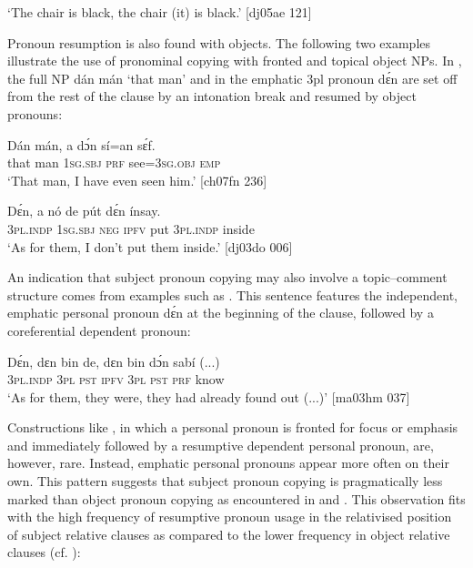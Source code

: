 \glt ‘The chair is black, the chair (it) is black.’ [dj05ae 121]
\z

Pronoun resumption is also found with objects{\fff}. The following two examples illustrate the use of pronominal copying with fronted and topical object NPs. In , the full NP dán mán ‘that man’ and in  the emphatic 3pl pronoun dɛ́n are set off from the rest of the clause by an intonation break and resumed by object pronouns: 


\ea%
    \label{ex:key:516}
    \gll Dán    mán,  a    dɔ́n  sí=an    sɛ́f.\\
that    man    \textsc{1sg.sbj}  \textsc{prf}  see=\textsc{3sg.obj}  \textsc{emp}\\

\glt ‘That man, I have even seen him.’ [ch07fn 236]
\z


\ea%
    \label{ex:key:517}
    \gll Dɛ́n,    a    nó  de  pút  dɛ́n    ínsay.\\
\textsc{3pl.indp}  \textsc{1sg.sbj}  \textsc{neg}  \textsc{ipfv}  put  \textsc{3pl.indp}  inside\\

\glt ‘As for them, I don’t put them inside.’ [dj03do 006]
\z

An indication that subject pronoun copying may also involve a topic–comment structure comes from examples such as . This sentence features the independent, emphatic personal pronoun dɛ́n at the beginning of the clause, followed by a coreferential dependent pronoun:


\ea%
    \label{ex:key:518}
    \gll Dɛ́n,    dɛn  bin  de,  dɛn  bin  dɔ́n  sabí    (...)\\
\textsc{3pl.indp}  \textsc{3pl}  \textsc{pst}  \textsc{ipfv}  \textsc{3pl}  \textsc{pst}  \textsc{prf}  know\\

\glt ‘As for them, they were, they had already found out (...)’ [ma03hm 037]
\z

Constructions like , in which a personal pronoun is fronted for focus or emphasis and immediately followed by a resumptive dependent personal pronoun, are, however, rare. Instead, emphatic personal pronouns appear more often on their own. This pattern suggests that subject pronoun copying is pragmatically less marked than object pronoun copying as encountered in  and . This observation fits with the high frequency of resumptive pronoun usage in the relativised position of subject relative clauses as compared to the lower frequency in object relative clauses (cf. ):


